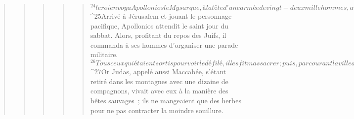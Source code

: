 \begin{verse}
\begin{verse}
\begin{verse}
\begin{verse}
\begin{verse}
${}^{24}le roi envoya Apollonios le Mysarque, à la tête d’une armée de vingt-deux mille hommes, avec l’ordre d’égorger tous ceux qui étaient dans la force de l’âge et de vendre les femmes et les jeunes enfants. 
${}^{25}Arrivé à Jérusalem et jouant le personnage pacifique, Apollonios attendit le saint jour du sabbat. Alors, profitant du repos des Juifs, il commanda à ses hommes d’organiser une parade militaire. 
${}^{26}Tous ceux qui étaient sortis pour voir le défilé, il les fit massacrer ; puis, parcourant la ville avec ses soldats en armes, il abattit une foule considérable de gens.
${}^{27}Or Judas, appelé aussi Maccabée, s’étant retiré dans les montagnes avec une dizaine de compagnons, vivait avec eux à la manière des bêtes sauvages ; ils ne mangeaient que des herbes pour ne pas contracter la moindre souillure.
      

\end{verse}
\end{verse}
\end{verse}
\end{verse}
\end{verse}
